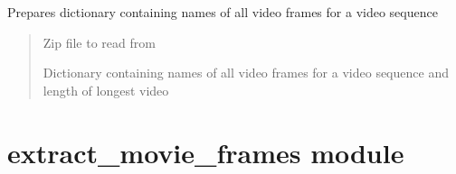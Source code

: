 \documentclass[letterpaper,10pt,english]{sphinxmanual}
\begin{document}

\begin{fulllineitems}
\label{\detokenize{dataset:dataset.videos_zip_to_dict}}
\pysigstartsignatures
{}
\pysigstopsignatures
\sphinxAtStartPar
Prepares dictionary containing names of all video frames for a video sequence
\begin{quote}\begin{description}
\sphinxAtStartPar
{} \textendash{} Zip file to read from

\sphinxAtStartPar
Dictionary containing names of all video frames for a video sequence and length of longest video

\end{description}\end{quote}

\end{fulllineitems}


\sphinxstepscope


\section{extract\_movie\_frames module}
\label{\detokenize{extract_movie_frames:module-extract_movie_frames}}\label{\detokenize{extract_movie_frames:extract-movie-frames-module}}\label{\detokenize{extract_movie_frames::doc}}
\end{document}
